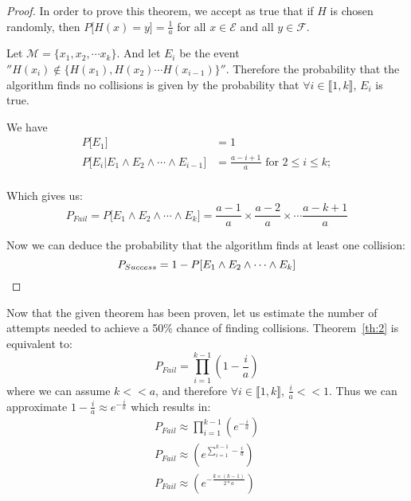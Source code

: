 \begin{proof}
  In order to prove this theorem, we accept as true that if $H$ is chosen randomly, then $P\lbrack H (x) = y \rbrack = \frac{1}{a}$ for all $x \in  \mathcal{E}$ and all $y \in  \mathcal{F}$.

  Let $\mathcal{M} = \{x_1,x_2,\cdots x_k\}$. And let $E_i$ be the event $''H(x_i) \notin \{H(x_1),H(x_2) \cdots H(x_{i-1})\}''$. Therefore the probability that the algorithm finds no collisions is given by the probability that $\forall i \in \llbracket 1,k \rrbracket$, $E_i$ is true. 

  We have
\begin{equation}
\begin{aligned}
  P\lbrack E_1\rbrack & = 1  \\
  P\lbrack E_i \vert E_1 \wedge E_2 \wedge \cdots \wedge E_{i-1}\rbrack & = \frac{a - i + 1}{a}  \mbox{ for } 2 \le i \le k; \\
  \end{aligned}
\end{equation}

Which gives us:
\begin{equation}
    P_{Fail}=P\lbrack E_1 \wedge E_2 \wedge \cdots \wedge E_{k}\rbrack  = \frac{a -  1}{a} \times \frac{a -  2}{a} \times \cdots \frac{a -  k + 1}{a}
 \end{equation}

    Now we can deduce the probability that the algorithm finds at least one collision:
\begin{equation}
 P_{Success}= 1 - P\lbrack E_1 \wedge E_2 \wedge \cdots \wedge E_{k}\rbrack  \\
\end{equation}
\end{proof}

\vspace{.5cm}

Now that the given theorem has been proven, let us estimate the number of attempts needed to achieve a 50\% chance of finding collisions.
Theorem~\ref{th:2} is equivalent to:
\begin{equation}
P_{Fail}= \prod_{i=1}^{k-1}(1-\frac{i}{a})
\end{equation}
where we can assume $k<<a$, and therefore $\forall i \in \llbracket 1,k \rrbracket$, $\frac{i}{a}<<1$.
Thus we can approximate $1-\frac{i}{a} \approx e^{-\frac{i}{a}}$ which results in:
\begin{equation}
  \begin{aligned}
  P_{Fail} \approx \prod_{i=1}^{k-1}(e^{-\frac{i}{a}}) \\
  P_{Fail} \approx (e^{\sum_{i=1}^{k-1}-\frac{i}{a}}) \\
  P_{Fail} \approx (e^{-\frac{k\times (k-1)}{2*a}}) \\
  \end{aligned}
\end{equation}

